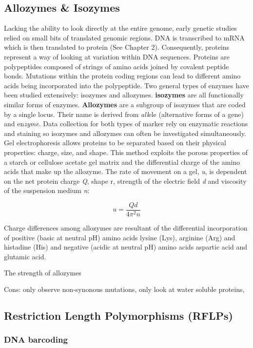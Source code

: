 \documentclass[11pt, oneside]{article}
\begin{document}
\subsection{Allozymes \& Isozymes}
Lacking the ability to look directly at the entire genome, early genetic studies relied on small bits of translated 
genomic regions. DNA is transcribed to mRNA which is then translated to protein (See Chapter 2). Consequently,
proteins represent a way of looking at variation within DNA sequences. Proteins are polypeptides 
composed of strings of amino acids joined by covalent peptide bonds. Mutations within the protein coding 
regions can lead to different amino acids being incorporated into the polypeptide. Two general types of enzymes 
have been studied extensively:  isozymes and allozymes.  \textbf{isozymes} are all functionally similar forms of 
enzymes. \textbf{Allozymes} are a subgroup of isozymes that are coded by a single locus. 
Their name is derived from \textit{all}ele (alternative forms of a gene) and en\textit{zyme}. Data collection for 
both types of marker rely on enzymatic reactions and staining so isozymes and allozymes can often be 
investigated simultaneously.
Gel electrophoresis allows proteins to be separated based on their physical properties: charge, size, and shape. 
This method exploits the porous properties of a starch or cellulose acetate gel matrix and the differential charge 
of the amino acids that make up the allozyme. The rate of movement on a gel, \textit{u}, is dependent on the net
protein charge \textit{Q}, shape {r}, strength of the electric field \textit{d} and viscosity of the suspension 
medium \textit{n}:

\begin{equation*}
u=\frac{Qd}{4\pi^2n}
\end{equation*}

Charge differences among allozymes are resultant of the 
differential incorporation of positive (basic at neutral pH) amino acids lysine (Lys), arginine (Arg) and 
histadine (His) and negative (acidic at neutral pH) amino acids aspartic acid and glutamic acid. 

The strength of allozymes 


Cons: only observe non-synonous mutations, only look at water soluble proteins, 
\subsection{Restriction Length Polymorphisms (RFLPs)}


\subsubsection{DNA barcoding}
\end{document}
